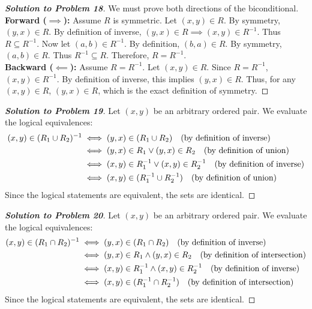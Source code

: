 \documentclass[11pt, a4paper]{article}
\theoremstyle{definition}
\theoremstyle{remark}
\begin{document}
\begin{proof}[\textbf{Solution to Problem 18}]
We must prove both directions of the biconditional. \\
\textbf{Forward ($\implies$):} Assume $R$ is symmetric. Let $(x, y) \in R$. By symmetry, $(y, x) \in R$. By definition of inverse, $(y, x) \in R \implies (x, y) \in R^{-1}$. Thus $R \subseteq R^{-1}$. Now let $(a, b) \in R^{-1}$. By definition, $(b, a) \in R$. By symmetry, $(a, b) \in R$. Thus $R^{-1} \subseteq R$. Therefore, $R = R^{-1}$. \\
\textbf{Backward ($\impliedby$):} Assume $R = R^{-1}$. Let $(x, y) \in R$. Since $R = R^{-1}$, $(x, y) \in R^{-1}$. By definition of inverse, this implies $(y, x) \in R$. Thus, for any $(x, y) \in R$, $(y, x) \in R$, which is the exact definition of symmetry.
\end{proof}

\begin{proof}[\textbf{Solution to Problem 19}]
Let $(x, y)$ be an arbitrary ordered pair. We evaluate the logical equivalences:
\begin{align*}
(x, y) \in (R_1 \cup R_2)^{-1} &\iff (y, x) \in (R_1 \cup R_2) \quad \text{(by definition of inverse)} \\ \relax
&\iff (y, x) \in R_1 \lor (y, x) \in R_2 \quad \text{(by definition of union)} \\ \relax
&\iff (x, y) \in R_1^{-1} \lor (x, y) \in R_2^{-1} \quad \text{(by definition of inverse)} \\ \relax
&\iff (x, y) \in (R_1^{-1} \cup R_2^{-1}) \quad \text{(by definition of union)}
\end{align*}
Since the logical statements are equivalent, the sets are identical.
\end{proof}

\begin{proof}[\textbf{Solution to Problem 20}]
Let $(x, y)$ be an arbitrary ordered pair. We evaluate the logical equivalences:
\begin{align*}
(x, y) \in (R_1 \cap R_2)^{-1} &\iff (y, x) \in (R_1 \cap R_2) \quad \text{(by definition of inverse)} \\ \relax
&\iff (y, x) \in R_1 \land (y, x) \in R_2 \quad \text{(by definition of intersection)} \\ \relax
&\iff (x, y) \in R_1^{-1} \land (x, y) \in R_2^{-1} \quad \text{(by definition of inverse)} \\ \relax
&\iff (x, y) \in (R_1^{-1} \cap R_2^{-1}) \quad \text{(by definition of intersection)}
\end{align*}
Since the logical statements are equivalent, the sets are identical.
\end{proof}
\end{document}
